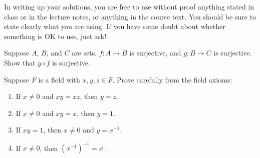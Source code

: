 \documentclass[12pt,letterpaper,reqno]{amsart}
\numberwithin{equation}{section}
\newcommand{\R}{\ensuremath{\mathbb R}}
\newcommand{\Q}{\ensuremath{\mathbb Q}}
\begin{document}
In writing up your solutions, you are free to use without proof anything stated in class
or in the lecture notes, or anything in the course text. 
You should be sure to state clearly what you are using.
If you have some doubt about whether something is OK to use, just ask!

\smallskip



\begin{exercise}[5 points] Suppose $A$, $B$, and $C$ are sets, $f:A\to B$ is surjective, and $g:B\to C$ is surjective. Show that $g\circ f$ is surjective. 
\end{exercise}


\begin{exercise} \label{ex:field-checks}
Suppose $F$ is a field with $x,y,z \in F$.
Prove carefully from the field axioms:
\begin{enumerate}
  \item If $x \neq 0$ and $xy = xz$, then $y = z$.
  \item If $x \neq 0$ and $xy = x$, then $y = 1$.
  \item If $xy = 1$, then $x \neq 0$ and $y = x^{-1}$.
  \item If $x \neq 0$, then $(x^{-1})^{-1} = x$.
\end{enumerate}
\end{exercise}


%
\end{document}
